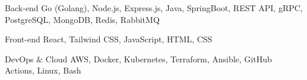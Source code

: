 
\begin{cvskills}

  \cvskill
    {Back-end} %
    {Go (Golang), Node.js, Express.js, Java, SpringBoot, REST API, gRPC, PostgreSQL, MongoDB, Redis, RabbitMQ} %

  \cvskill
    {Front-end} %
    {React, Tailwind CSS, JavaScript, HTML, CSS} %

  \cvskill
    {DevOps \& Cloud} %
    {AWS, Docker, Kubernetes, Terraform, Ansible, GitHub Actions, Linux, Bash} %
\end{cvskills}
